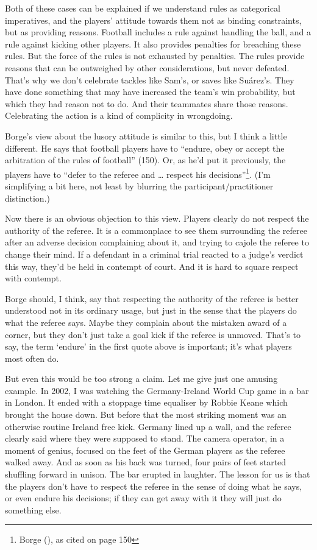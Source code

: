 \documentclass[
  11pt,
  letterpaper,
  DIV=11,
  numbers=noendperiod,
  twoside]{scrartcl}
\begin{document}
Both of these cases can be explained if we understand rules as
categorical imperatives, and the players' attitude towards them not as
binding constraints, but as providing reasons. Football includes a rule
against handling the ball, and a rule against kicking other players. It
also provides penalties for breaching these rules. But the force of the
rules is not exhausted by penalties. The rules provide reasons that can
be outweighed by other considerations, but never defeated. That's why we
don't celebrate tackles like Sam's, or saves like Suárez's. They have
done something that may have increased the team's win probability, but
which they had reason not to do. And their teammates share those
reasons. Celebrating the action is a kind of complicity in wrongdoing.

Borge's view about the lusory attitude is similar to this, but I think a
little different. He says that football players have to ``endure, obey
or accept the arbitration of the rules of football'' (150). Or, as he'd
put it previously, the players have to ``defer to the referee and
\ldots{} respect his decisions''\footnote{Borge
  (), as cited on page 150}. (I'm
simplifying a bit here, not least by blurring the
participant/practitioner distinction.)

Now there is an obvious objection to this view. Players clearly do not
respect the authority of the referee. It is a commonplace to see them
surrounding the referee after an adverse decision complaining about it,
and trying to cajole the referee to change their mind. If a defendant in
a criminal trial reacted to a judge's verdict this way, they'd be held
in contempt of court. And it is hard to square respect with contempt.

Borge should, I think, say that respecting the authority of the referee
is better understood not in its ordinary usage, but just in the sense
that the players do what the referee says. Maybe they complain about the
mistaken award of a corner, but they don't just take a goal kick if the
referee is unmoved. That's to say, the term `endure' in the first quote
above is important; it's what players most often do.

But even this would be too strong a claim. Let me give just one amusing
example. In 2002, I was watching the Germany-Ireland World Cup game in a
bar in London. It ended with a stoppage time equaliser by Robbie Keane
which brought the house down. But before that the most striking moment
was an otherwise routine Ireland free kick. Germany lined up a wall, and
the referee clearly said where they were supposed to stand. The camera
operator, in a moment of genius, focused on the feet of the German
players as the referee walked away. And as soon as his back was turned,
four pairs of feet started shuffling forward in unison. The bar erupted
in laughter. The lesson for us is that the players don't have to respect
the referee in the sense of doing what he says, or even endure his
decisions; if they can get away with it they will just do something
else.
\end{document}
